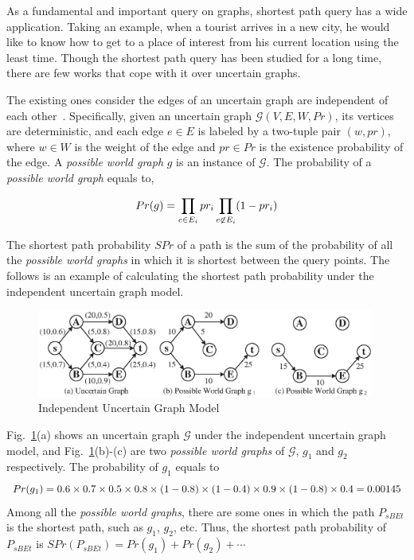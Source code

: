 \documentclass[runningheads,a4paper]{llncs}
\begin{document}
As a fundamental and important query on graphs, shortest path query has a wide application. Taking an example, when a tourist arrives in a new city, he would like to know how to get to a place of interest from his current location using the least time. Though the shortest path query has been studied for a long time, there are few works that cope with it over uncertain graphs.

The existing ones consider the edges of an uncertain graph are independent of each other~\cite{yuan2010efficiently}\cite{zou2011top}. Specifically, given an uncertain graph $\mathcal{G}(V,E,W,Pr)$, its vertices are deterministic, and each edge $e\in E$ is labeled by a two-tuple pair $(w,pr)$, where $w\in W$ is the weight of the edge and $pr\in Pr$ is the existence probability of the edge. A \emph{possible world graph} $g$ is an instance of $\mathcal{G}$. The probability of a \emph{possible world graph} equals to,

\vspace{-0.2cm}
\[
\small{
Pr(g)=
\prod_{\small{e\in E_i}}
pr_i
\prod_{\small{e\not\in E_i}}
(1-pr_i)
}
\]

The shortest path probability $SPr$ of a path is the sum of the probability of all the \emph{possible world graphs} in which it is shortest between the query points. The follows is an example of calculating the shortest path probability under the independent uncertain graph model.

\begin{example}

\vspace{-1cm}
\begin{figure}[htbp]
\centering
  \includegraphics[width=0.99\textwidth]{fig-indep-ug.eps}
\vspace{-0.5cm}
  \caption{\small{Independent Uncertain Graph Model}}
  \label{fig:indep-ug}
\vspace{-0.7cm}
\end{figure}

Fig.~\ref{fig:indep-ug}(a) shows an uncertain graph $\mathcal{G}$ under the independent uncertain graph model, and Fig.~\ref{fig:indep-ug}(b)-(c) are two \emph{possible world graphs} of $\mathcal{G}$, $g_1$ and $g_2$ respectively. The probability of $g_1$ equals to
\vspace{-0.2cm}
\[
Pr(g_1)=0.6\times0.7\times0.5\times0.8\times(1-0.8)\times(1-0.4)\times0.9\times(1-0.8)\times0.4=0.00145
\vspace{-0.2cm}
\]
Among all the \emph{possible world graphs}, there are some ones in which the path $P_{sBEt}$ is the shortest path, such as $g_1$, $g_2$, etc. Thus, the shortest path probability of $P_{sBEt}$ is $SPr(P_{sBEt})=Pr(g_1)+Pr(g_2)+\cdots$
\vspace{-0.2cm}
\end{example}
\end{document}
